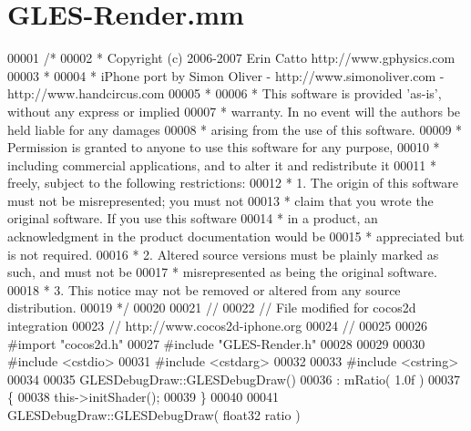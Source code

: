 \hypertarget{_g_l_e_s-_render_8mm}{\section{G\-L\-E\-S-\/\-Render.mm}
\label{d3/db9/_g_l_e_s-_render_8mm}
}

\begin{DoxyCode}
00001 \textcolor{comment}{/*}
00002 \textcolor{comment}{ * Copyright (c) 2006-2007 Erin Catto http://www.gphysics.com}
00003 \textcolor{comment}{ *}
00004 \textcolor{comment}{ * iPhone port by Simon Oliver - http://www.simonoliver.com - http://www.handcircus.com}
00005 \textcolor{comment}{ *}
00006 \textcolor{comment}{ * This software is provided 'as-is', without any express or implied}
00007 \textcolor{comment}{ * warranty.  In no event will the authors be held liable for any damages}
00008 \textcolor{comment}{ * arising from the use of this software.}
00009 \textcolor{comment}{ * Permission is granted to anyone to use this software for any purpose,}
00010 \textcolor{comment}{ * including commercial applications, and to alter it and redistribute it}
00011 \textcolor{comment}{ * freely, subject to the following restrictions:}
00012 \textcolor{comment}{ * 1. The origin of this software must not be misrepresented; you must not}
00013 \textcolor{comment}{ * claim that you wrote the original software. If you use this software}
00014 \textcolor{comment}{ * in a product, an acknowledgment in the product documentation would be}
00015 \textcolor{comment}{ * appreciated but is not required.}
00016 \textcolor{comment}{ * 2. Altered source versions must be plainly marked as such, and must not be}
00017 \textcolor{comment}{ * misrepresented as being the original software.}
00018 \textcolor{comment}{ * 3. This notice may not be removed or altered from any source distribution.}
00019 \textcolor{comment}{ */}
00020 
00021 \textcolor{comment}{//}
00022 \textcolor{comment}{// File modified for cocos2d integration}
00023 \textcolor{comment}{// http://www.cocos2d-iphone.org}
00024 \textcolor{comment}{//}
00025 
00026 \textcolor{preprocessor}{#import "cocos2d.h"}
00027 \textcolor{preprocessor}{#include "GLES-Render.h"}
00028 
00029 
00030 \textcolor{preprocessor}{#include <cstdio>}
00031 \textcolor{preprocessor}{#include <cstdarg>}
00032 
00033 \textcolor{preprocessor}{#include <cstring>}
00034 
00035 GLESDebugDraw::GLESDebugDraw()
00036 : mRatio( 1.0f )
00037 \{
00038     this->initShader();
00039 \}
00040 
00041 GLESDebugDraw::GLESDebugDraw( float32 ratio )

\end{DoxyCode}
